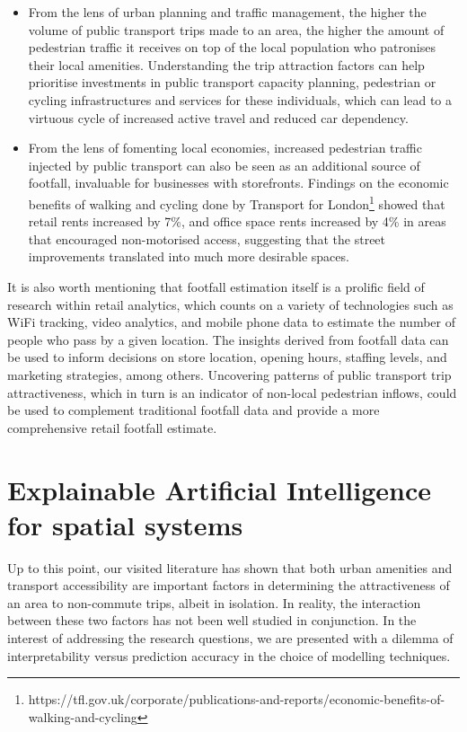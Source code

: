 \begin{itemize}
    \setlength\itemsep{0em}
    \item From the lens of urban planning and traffic management, the higher the volume of public transport trips made to an area, the higher the amount of pedestrian traffic it receives on top of the local population who patronises their local amenities. Understanding the trip attraction factors can help prioritise investments in public transport capacity planning, pedestrian or cycling infrastructures and services for these individuals, which can lead to a virtuous cycle of increased active travel and reduced car dependency.
    \item From the lens of fomenting local economies, increased pedestrian traffic injected by public transport can also be seen as an additional source of footfall, invaluable for businesses with storefronts. Findings on the economic benefits of walking and cycling done by Transport for London\footnote{https://tfl.gov.uk/corporate/publications-and-reports/economic-benefits-of-walking-and-cycling} showed that retail rents increased by 7\%, and office space rents increased by 4\% in areas that encouraged non-motorised access, suggesting that the street improvements translated into much more desirable spaces.
\end{itemize}

It is also worth mentioning that footfall estimation itself is a prolific field of research within retail analytics, which counts on a variety of technologies such as WiFi tracking, video analytics, and mobile phone data to estimate the number of people who pass by a given location. The insights derived from footfall data can be used to inform decisions on store location, opening hours, staffing levels, and marketing strategies, among others. Uncovering patterns of public transport trip attractiveness, which in turn is an indicator of non-local pedestrian inflows, could be used to complement traditional footfall data and provide a more comprehensive retail footfall estimate.

\section{Explainable Artificial Intelligence for spatial systems}

Up to this point, our visited literature has shown that both urban amenities and transport accessibility are important factors in determining the attractiveness of an area to non-commute trips, albeit in isolation. In reality, the interaction between these two factors has not been well studied in conjunction. In the interest of addressing the research questions, we are presented with a dilemma of interpretability versus prediction accuracy in the choice of modelling techniques.

